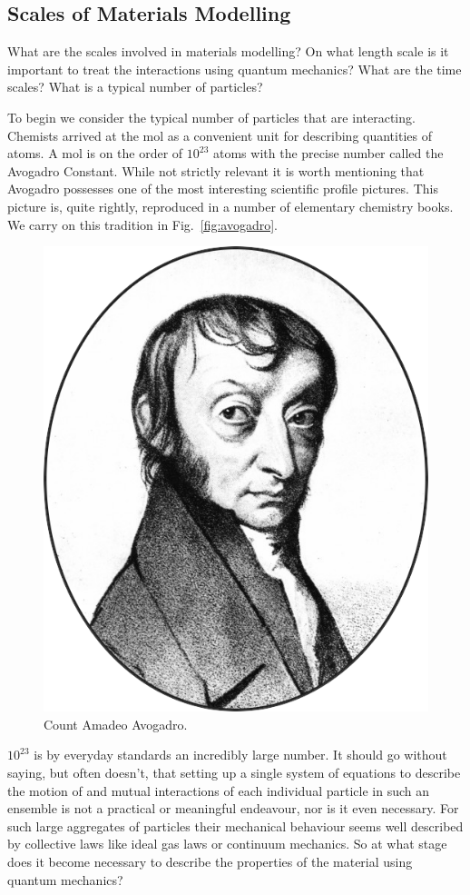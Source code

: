 \subsection{Scales of Materials Modelling}
What are the scales involved in materials modelling?
On what length scale is it important to treat the interactions
using quantum mechanics? What are the time scales? 
What is a typical number of particles?

To begin we consider the typical number of particles that are interacting.
Chemists arrived at the mol as a convenient unit for describing
quantities of atoms. A mol is on the order of $10^{23}$ atoms with
the precise number called the Avogadro Constant. While not strictly relevant
it is worth mentioning that Avogadro possesses one of the most
interesting scientific profile pictures. This picture is, quite rightly, reproduced
in a number of elementary chemistry books. We carry on this tradition 
in Fig.~\ref{fig:avogadro}.
%
\begin{figure}
\begin{center}
\includegraphics[scale=0.4]{./intro/Amadeo_Avogadro.png}
\end{center}
\caption{Count Amadeo Avogadro.}
\end{figure}
%
$10^{23}$ is by everyday standards an incredibly large number. 
It should go without saying, but often doesn't, that setting 
up a single system of equations to describe the motion of and mutual 
interactions of each individual particle in such an ensemble is not
a practical or meaningful endeavour, nor is it even necessary.
For such large aggregates of particles their mechanical behaviour seems 
well described by collective laws like ideal gas laws or continuum mechanics. 
So at what stage does it become necessary to describe the properties of the material
using quantum mechanics? 

